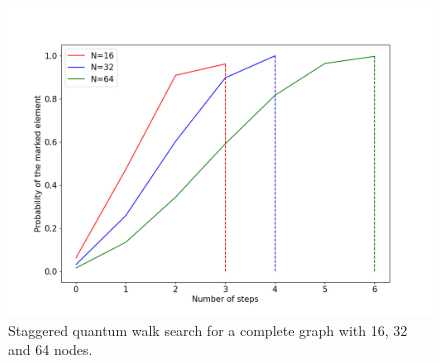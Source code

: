 \documentclass[../../dissertation.tex]{subfiles}
\begin{document}
\begin{figure}[!h]
	\centering
	\includegraphics[scale=0.40]{img/StagQuantumWalk/Search/163264.png}
	\caption{Staggered quantum walk search for a complete graph with 16, 32 and 64 nodes.}
	\label{fig:StagSearch}
\end{figure}


\end{document}
